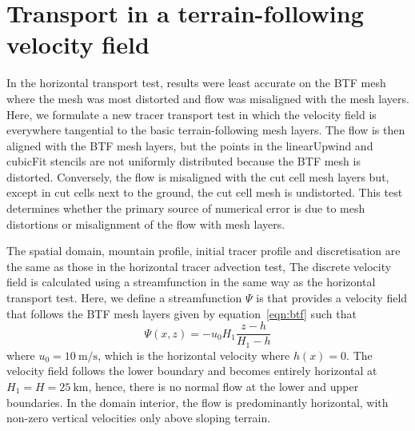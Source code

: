 \section{Transport in a terrain-following velocity field}


In the horizontal transport test, results were least accurate on the BTF mesh where the mesh was most distorted and flow was misaligned with the mesh layers.
Here, we formulate a new tracer transport test in which the velocity field is everywhere tangential to the basic terrain-following mesh layers.
The flow is then aligned with the BTF mesh layers, but the points in the linearUpwind and cubicFit stencils are not uniformly distributed because the BTF mesh is distorted.
Conversely, the flow is misaligned with the cut cell mesh layers but, except in cut cells next to the ground, the cut cell mesh is undistorted.
This test determines whether the primary source of numerical error is due to mesh distortions or misalignment of the flow with mesh layers.

The spatial domain, mountain profile, initial tracer profile and discretisation are the same as those in the horizontal tracer advection test, 
The discrete velocity field is calculated using a streamfunction in the same way as the horizontal transport test.
Here, we define a streamfunction $\Psi$ is that provides a velocity field that follows the BTF mesh layers given by equation~\eqref{eqn:btf} such that
\begin{equation}
	\Psi(x,z) = -u_0 H_1 \frac{z - h}{H_1 - h} \label{eqn:streamfunc-btf}
\end{equation}
where $u_0 = \SI{10}{\meter\per\second}$, which is the horizontal velocity where $h(x) = 0$.
The velocity field follows the lower boundary and becomes entirely horizontal at $H_1 = H = \SI{25}{\kilo\meter}$, hence, there is no normal flow at the lower and upper boundaries.
In the domain interior, the flow is predominantly horizontal, with non-zero vertical velocities only above sloping terrain.

